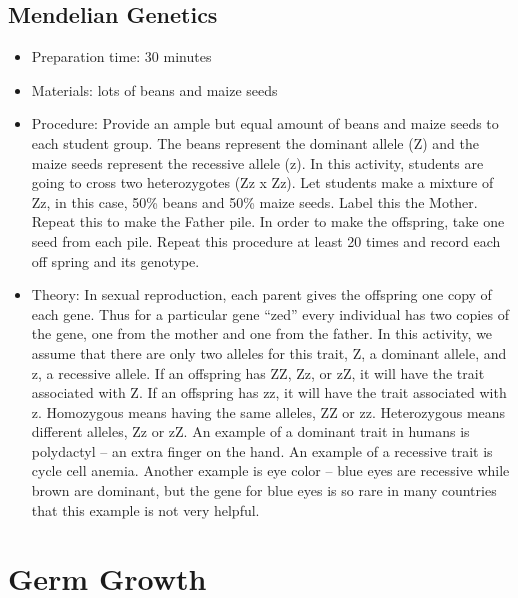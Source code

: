 \subsection{Mendelian Genetics}
\begin{itemize}
\item{Preparation time: 30 minutes}
\item{Materials: lots of beans and maize seeds}
\item{Procedure: Provide an ample but equal amount of beans and maize seeds to each student group. The beans represent the dominant allele (Z) and the maize seeds represent the recessive allele (z). In this activity, students are going to cross two heterozygotes (Zz x Zz). Let students make a mixture of Zz, in this case, 50\% beans and 50\% maize seeds. Label this the Mother. Repeat this to make the Father pile. In order to make the offspring, take one seed from each pile. Repeat this procedure at least 20 times and record each off spring and its genotype.}
\item{Theory: In sexual reproduction, each parent gives the offspring one copy of each gene. Thus for a particular gene “zed” every individual has two copies of the gene, one from the mother and one from the father. In this activity, we assume that there are only two alleles for this trait, Z, a dominant allele, and z, a recessive allele. If an offspring has ZZ, Zz, or zZ, it will have the trait associated with Z. If an offspring has zz, it will have the trait associated with z. Homozygous means having the same alleles, ZZ or zz. Heterozygous means different alleles, Zz or zZ. An example of a dominant trait in humans is polydactyl -- an extra finger on the hand. An example of a recessive trait is cycle cell anemia. Another example is eye color -- blue eyes are recessive while brown are dominant, but the gene for blue eyes is so rare in many countries that this example is not very helpful.}
\end{itemize}

\section{Germ Growth}

